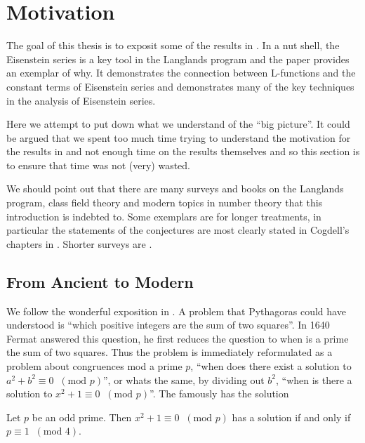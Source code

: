 \section*{Motivation}
The goal of this thesis is to exposit some of the results in \cite{jiangPolesCertainResidual2013}. In a nut shell, the Eisenstein series is a key tool in the Langlands program and the paper \cite{jiangPolesCertainResidual2013} provides an exemplar of why. It demonstrates the connection between L-functions and the constant terms of Eisenstein series and demonstrates many of the key techniques in the analysis of Eisenstein series. 

Here we attempt to put down what we understand of the ``big picture''. It could be argued that we spent too much time trying to understand the motivation for the results in \cite{jiangPolesCertainResidual2013} and not enough time on the results themselves and so this section is to ensure that time was not (very) wasted. 

We should point out that there are many surveys and books on the Langlands program, class field theory and modern topics in number theory that this introduction is indebted to. Some exemplars are \cite{fleigEisensteinSeriesAutomorphic2016, bumpIntroductionLanglandsProgram2004} for longer treatments, in particular the statements of the conjectures are most clearly stated in Cogdell's chapters in \cite{bumpIntroductionLanglandsProgram2004}. Shorter surveys are \cite{gelbartElementaryIntroductionLanglands1984, langlandsFunctorialityTheoryAutomorphic, langlandsRepresentationTheoryIts1989, arthurAUTOMORPHICREPRESENTATIONSNUMBER1981}.

\subsection{From Ancient to Modern}
We follow the wonderful exposition in \cite{weinsteinReciprocityLawsGalois2015}. A problem that Pythagoras could have understood is ``which positive integers are the sum of two squares''. In 1640 Fermat answered this question, he first reduces the question to when is a prime the sum of two squares. Thus the problem is immediately reformulated as a problem about congruences mod a prime \(p\), ``when does there exist a solution to \(a^2  +b^2 \equiv 0 \;\;(\text{mod }p) \)'', or whats the same, by dividing out \(b^2\), ``when is there a solution to \(x^2 + 1 \equiv 0 \;\;(\text{mod }p)\)''. The famously has the solution 
\begin{Theorem}
	Let \(p\) be an odd prime. Then \(x^2 + 1 \equiv 0 \;\;(\text{mod }p)\) has a solution if and only if \(p\equiv 1 \;\;(\text{mod }4) \).
\end{Theorem}


